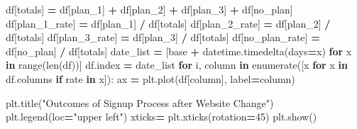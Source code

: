 \documentclass[
]{book}
\newenvironment{Shaded}{\begin{snugshade}}{\end{snugshade}}
\newcommand{\BuiltInTok}[1]{#1}
\newcommand{\ControlFlowTok}[1]{\textcolor[rgb]{0.13,0.29,0.53}{\textbf{#1}}}
\newcommand{\DecValTok}[1]{\textcolor[rgb]{0.00,0.00,0.81}{#1}}
\newcommand{\KeywordTok}[1]{\textcolor[rgb]{0.13,0.29,0.53}{\textbf{#1}}}
\newcommand{\NormalTok}[1]{#1}
\newcommand{\OperatorTok}[1]{\textcolor[rgb]{0.81,0.36,0.00}{\textbf{#1}}}
\newcommand{\StringTok}[1]{\textcolor[rgb]{0.31,0.60,0.02}{#1}}
\theoremstyle{definition}
\theoremstyle{definition}
\theoremstyle{definition}
\theoremstyle{remark}
\begin{document}
\begin{Shaded}
\begin{Highlighting}[]
\NormalTok{df[}\StringTok{\textquotesingle{}totals\textquotesingle{}}\NormalTok{] }\OperatorTok{=}\NormalTok{ df[}\StringTok{\textquotesingle{}plan\_1\textquotesingle{}}\NormalTok{] }\OperatorTok{+}\NormalTok{ df[}\StringTok{\textquotesingle{}plan\_2\textquotesingle{}}\NormalTok{] }\OperatorTok{+}\NormalTok{ df[}\StringTok{\textquotesingle{}plan\_3\textquotesingle{}}\NormalTok{] }\OperatorTok{+}\NormalTok{ df[}\StringTok{\textquotesingle{}no\_plan\textquotesingle{}}\NormalTok{]}
\NormalTok{df[}\StringTok{\textquotesingle{}plan\_1\_rate\textquotesingle{}}\NormalTok{] }\OperatorTok{=}\NormalTok{ df[}\StringTok{\textquotesingle{}plan\_1\textquotesingle{}}\NormalTok{] }\OperatorTok{/}\NormalTok{ df[}\StringTok{\textquotesingle{}totals\textquotesingle{}}\NormalTok{]}
\NormalTok{df[}\StringTok{\textquotesingle{}plan\_2\_rate\textquotesingle{}}\NormalTok{] }\OperatorTok{=}\NormalTok{ df[}\StringTok{\textquotesingle{}plan\_2\textquotesingle{}}\NormalTok{] }\OperatorTok{/}\NormalTok{ df[}\StringTok{\textquotesingle{}totals\textquotesingle{}}\NormalTok{]}
\NormalTok{df[}\StringTok{\textquotesingle{}plan\_3\_rate\textquotesingle{}}\NormalTok{] }\OperatorTok{=}\NormalTok{ df[}\StringTok{\textquotesingle{}plan\_3\textquotesingle{}}\NormalTok{] }\OperatorTok{/}\NormalTok{ df[}\StringTok{\textquotesingle{}totals\textquotesingle{}}\NormalTok{]}
\NormalTok{df[}\StringTok{\textquotesingle{}no\_plan\_rate\textquotesingle{}}\NormalTok{] }\OperatorTok{=}\NormalTok{ df[}\StringTok{\textquotesingle{}no\_plan\textquotesingle{}}\NormalTok{] }\OperatorTok{/}\NormalTok{ df[}\StringTok{\textquotesingle{}totals\textquotesingle{}}\NormalTok{]}
\NormalTok{date\_list }\OperatorTok{=}\NormalTok{ [base }\OperatorTok{+}\NormalTok{ datetime.timedelta(days}\OperatorTok{=}\NormalTok{x) }\ControlFlowTok{for}\NormalTok{ x }\KeywordTok{in} \BuiltInTok{range}\NormalTok{(}\BuiltInTok{len}\NormalTok{(df))]}
\NormalTok{df.index }\OperatorTok{=}\NormalTok{ date\_list}
\ControlFlowTok{for}\NormalTok{ i, column }\KeywordTok{in} \BuiltInTok{enumerate}\NormalTok{([x }\ControlFlowTok{for}\NormalTok{ x }\KeywordTok{in}\NormalTok{ df.columns }\ControlFlowTok{if} \StringTok{\textquotesingle{}rate\textquotesingle{}} \KeywordTok{in}\NormalTok{ x]):}
\NormalTok{    ax }\OperatorTok{=}\NormalTok{ plt.plot(df[column], label}\OperatorTok{=}\NormalTok{column)}

\NormalTok{plt.title(}\StringTok{"Outcomes of Signup Process after Website Change"}\NormalTok{)}
\NormalTok{plt.legend(loc}\OperatorTok{=}\StringTok{"upper left"}\NormalTok{)}
\NormalTok{xticks}\OperatorTok{=}\NormalTok{ plt.xticks(rotation}\OperatorTok{=}\DecValTok{45}\NormalTok{)}
\NormalTok{plt.show()}
\end{Highlighting}
\end{Shaded}
\end{document}
